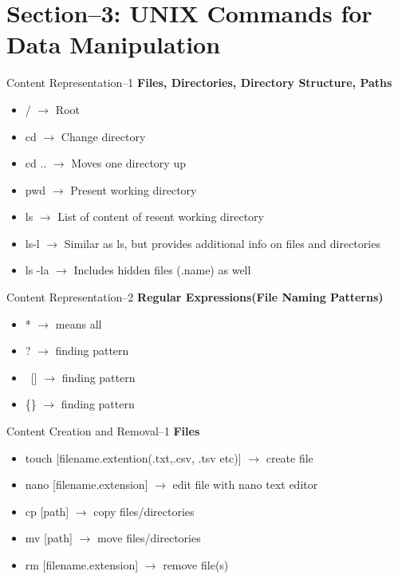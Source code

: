 


\maketitle
\section{Section--3: UNIX Commands for Data Manipulation}

\begin{frame}[t]{Content Representation--1}
	\textbf{Files, Directories, Directory Structure, Paths}
	\begin{itemize}
		\item / $\rightarrow$ Root 
		\item cd $\rightarrow$ Change directory
		\item  cd ..   $\rightarrow$ Moves one directory up
		\item pwd  $\rightarrow$ Present working directory
		\item ls  $\rightarrow$ List of content of resent working directory
		\item ls-l  $\rightarrow$ Similar as ls, but provides additional info 
		on files and 
		directories
		\item ls -la  $\rightarrow$ Includes hidden files (.name) as well
	\end{itemize}
\end{frame}

\begin{frame}[t]{Content Representation--2}
	\textbf{Regular Expressions(File Naming Patterns)}
	\begin{itemize}
		\item * $\rightarrow$ means all 
		\item ? $\rightarrow$ finding pattern
		\item \ [] $\rightarrow$ finding pattern
		\item \{\}  $\rightarrow$ finding pattern
	\end{itemize}
\end{frame}


\begin{frame}[t]{Content Creation and Removal--1}
	\textbf{Files}
	\begin{itemize}
		\item touch [filename.extention(.txt,.csv, .tsv etc)] $\rightarrow$ 
		create file 
		\item nano [filename.extension] $\rightarrow$ edit file with nano text 
		editor
		\item cp [path] $\rightarrow$ copy files/directories	
		\item mv [path] $\rightarrow$ move files/directories	
		\item rm [filename.extension] $\rightarrow$ remove file(s)	
	\end{itemize}
\end{frame}

